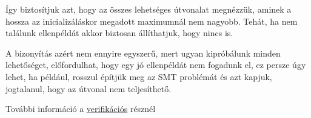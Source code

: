 Így biztosítjuk azt, hogy az összes lehetséges útvonalat megnézzük, aminek a hossza az inicializáláskor megadott maximumnál nem nagyobb. Tehát, ha nem találunk ellenpéldát akkor biztosan állíthatjuk, hogy nincs is.

A bizonyítás azért nem ennyire egyszerű, mert ugyan kipróbálunk minden lehetőséget, előfordulhat, hogy egy jó ellenpéldát nem fogadunk el, ez persze úgy lehet, ha például, rosszul építjük meg az SMT problémát és azt kapjuk, jogtalanul, hogy az útvonal nem teljesíthető.

További információ a \hyperref[sec:verifikacio]{verifikációs} résznél


